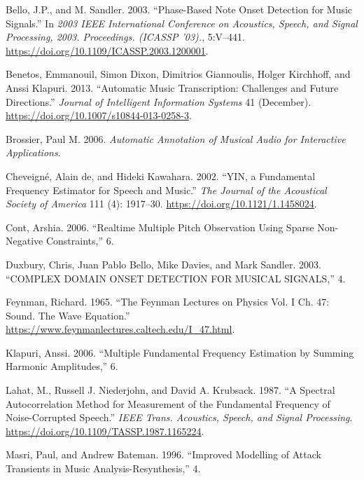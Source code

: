\documentclass[american,]{article}
\begin{document}
\hypertarget{refs}{}
\leavevmode\hypertarget{ref-bello}{}%
Bello, J.P., and M. Sandler. 2003. ``Phase-Based Note Onset Detection for Music Signals.'' In \emph{2003 IEEE International Conference on Acoustics, Speech, and Signal Processing, 2003. Proceedings. (ICASSP '03).}, 5:V--441. \url{https://doi.org/10.1109/ICASSP.2003.1200001}.

\leavevmode\hypertarget{ref-benetos_2013}{}%
Benetos, Emmanouil, Simon Dixon, Dimitrios Giannoulis, Holger Kirchhoff, and Anssi Klapuri. 2013. ``Automatic Music Transcription: Challenges and Future Directions.'' \emph{Journal of Intelligent Information Systems} 41 (December). \url{https://doi.org/10.1007/s10844-013-0258-3}.

\leavevmode\hypertarget{ref-brossier}{}%
Brossier, Paul M. 2006. \emph{Automatic Annotation of Musical Audio for Interactive Applications}.

\leavevmode\hypertarget{ref-yin_2002}{}%
Cheveigné, Alain de, and Hideki Kawahara. 2002. ``YIN, a Fundamental Frequency Estimator for Speech and Music.'' \emph{The Journal of the Acoustical Society of America} 111 (4): 1917--30. \url{https://doi.org/10.1121/1.1458024}.

\leavevmode\hypertarget{ref-cont_2006}{}%
Cont, Arshia. 2006. ``Realtime Multiple Pitch Observation Using Sparse Non-Negative Constraints,'' 6.

\leavevmode\hypertarget{ref-duxbury}{}%
Duxbury, Chris, Juan Pablo Bello, Mike Davies, and Mark Sandler. 2003. ``COMPLEX DOMAIN ONSET DETECTION FOR MUSICAL SIGNALS,'' 4.

\leavevmode\hypertarget{ref-feynman}{}%
Feynman, Richard. 1965. ``The Feynman Lectures on Physics Vol. I Ch. 47: Sound. The Wave Equation.'' \url{https://www.feynmanlectures.caltech.edu/I_47.html}.

\leavevmode\hypertarget{ref-klapuri}{}%
Klapuri, Anssi. 2006. ``Multiple Fundamental Frequency Estimation by Summing Harmonic Amplitudes,'' 6.

\leavevmode\hypertarget{ref-lahat_spectral_1987}{}%
Lahat, M., Russell J. Niederjohn, and David A. Krubsack. 1987. ``A Spectral Autocorrelation Method for Measurement of the Fundamental Frequency of Noise-Corrupted Speech.'' \emph{IEEE Trans. Acoustics, Speech, and Signal Processing}. \url{https://doi.org/10.1109/TASSP.1987.1165224}.

\leavevmode\hypertarget{ref-hfc}{}%
Masri, Paul, and Andrew Bateman. 1996. ``Improved Modelling of Attack Transients in Music Analysis-Resynthesis,'' 4.
\end{document}
